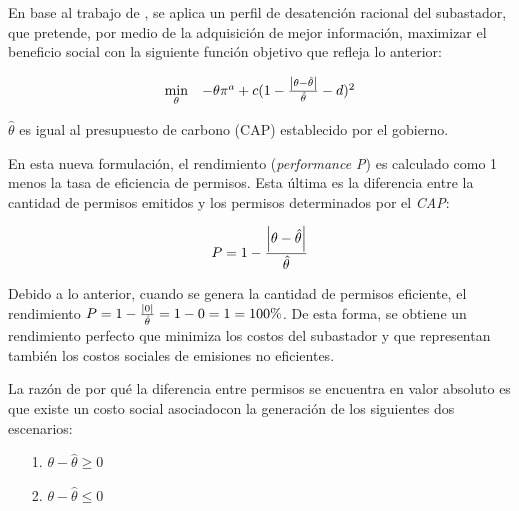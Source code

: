 En base al trabajo de , se aplica un perfil de desatención racional del subastador, que pretende, por medio de la adquisición de mejor información, maximizar el beneficio social con la siguiente función objetivo que refleja lo anterior:
\vspace{2.5mm}

\begin{equation}
\begin{array}{rrclcl}
\displaystyle \min_{\theta} & -\theta \pi^a + c(1-\frac{\abs{\theta - \hat{\theta}}}{\hat{\theta}}-d)^2 \\
\end{array}
\end{equation}
\vspace{2.5mm}

$\hat{\theta}$ es igual al presupuesto de carbono (CAP) establecido por el gobierno.
\vspace{2.5mm}

En esta nueva formulación, el rendimiento (\textit{performance P}) es calculado como 1 menos la tasa de eficiencia de permisos. Esta última es la diferencia entre la cantidad de permisos emitidos y los permisos determinados por el \textit{CAP}: 

\begin{equation}
\begin{array}{rrclcl}
\displaystyle P = 1- \frac{\abs{\theta - \hat{\theta}}}{\hat{\theta}} \\
\end{array}
\end{equation}


Debido a lo anterior, cuando se genera la cantidad de permisos eficiente, el rendimiento  $P = 1 - \frac{\abs{0}}{\hat{\theta}}= 1 - 0 = 1 =100\%$. De esta forma, se obtiene un rendimiento perfecto que minimiza los costos del subastador y que representan también los costos sociales de emisiones no eficientes.
\vspace{2.5mm}

La razón de por qué la diferencia entre permisos se encuentra en valor absoluto es que existe un costo social asociadocon la generación de los siguientes dos escenarios:

\begin{enumerate}
    \item[1.] $\theta - \hat{\theta} \geq 0$
    \item[2.] $\theta - \hat{\theta} \leq 0$
\end{enumerate}

